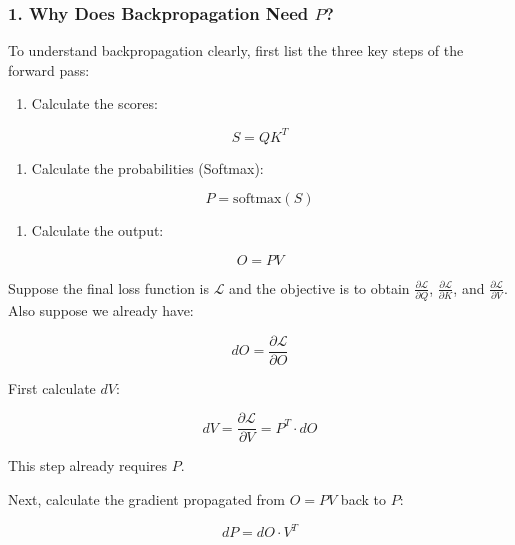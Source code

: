 \hypertarget{why-does-backpropagation-need-p}{%
\subsubsection{\texorpdfstring{1. Why Does Backpropagation Need \(P\)?}{1. Why Does Backpropagation Need P?}}\label{why-does-backpropagation-need-p}}

To understand backpropagation clearly, first list the three key steps of the forward pass:

\begin{enumerate}
\def\labelenumi{\arabic{enumi}.}
\tightlist
\item
{}
  Calculate the scores:
\end{enumerate}

\[
S = QK^T
\]

\begin{enumerate}
\def\labelenumi{\arabic{enumi}.}
\setcounter{enumi}{1}
\tightlist
\item
{}
  Calculate the probabilities (Softmax):
\end{enumerate}

\[
P = \mathrm{softmax}(S)
\]

\begin{enumerate}
\def\labelenumi{\arabic{enumi}.}
\setcounter{enumi}{2}
\tightlist
\item
{}
  Calculate the output:
\end{enumerate}

\[
O = PV
\]

Suppose the final loss function is \(\mathcal{L}\) and the objective is to obtain \(\frac{\partial \mathcal{L}}{\partial Q}\), \(\frac{\partial \mathcal{L}}{\partial K}\), and \(\frac{\partial \mathcal{L}}{\partial V}\). Also suppose we already have:

\[
dO = \frac{\partial \mathcal{L}}{\partial O}
\]

First calculate \(dV\):

\[
dV = \frac{\partial \mathcal{L}}{\partial V} = P^T \cdot dO
\]

This step already requires \(P\).

Next, calculate the gradient propagated from \(O = PV\) back to \(P\):

\[
dP = dO \cdot V^T
\]

